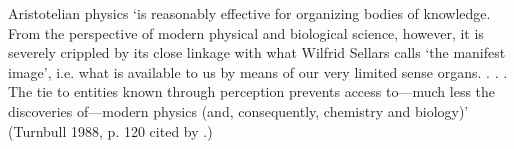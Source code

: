 \documentclass[12pt]{extarticle}
\begin{document}
\begin{multicols*}{3}
Aristotelian physics ‘is reasonably effective for organizing bodies of knowledge. From the 
perspective of modern physical and biological science, however, it is severely crippled by 
its close linkage with what Wilfrid Sellars calls ‘the manifest image’, i.e. what is available 
to us by means of our very limited sense organs. . . . The tie to entities known through 
perception prevents access to—much less the discoveries of—modern physics (and, consequently, 
chemistry and biology)’
(Turnbull 1988, p. 120 cited by \citealp{bennett:2003_learning}.)
 

    
    







\footnotesize


\end{multicols*}
\end{document}
